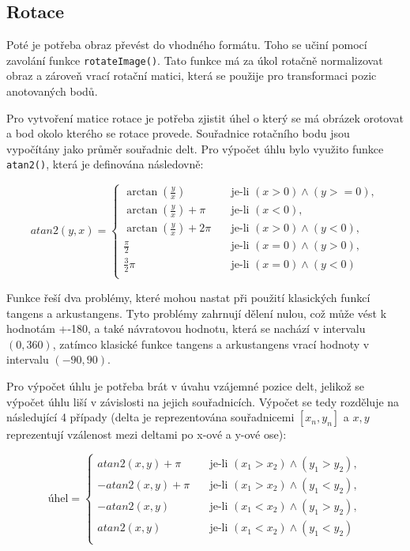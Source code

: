 \subsection{Rotace}
Poté je potřeba obraz převést do vhodného formátu. Toho se učiní pomocí zavolání funkce \texttt{rotateImage()}. Tato funkce má za úkol rotačně normalizovat obraz a zároveň vrací rotační matici, která se použije pro transformaci pozic anotovaných bodů.

Pro vytvoření matice rotace je potřeba zjistit úhel o který se má obrázek orotovat a bod okolo kterého se rotace provede. Souřadnice rotačního bodu jsou vypočítány jako průměr souřadnic delt. Pro výpočet úhlu bylo využito funkce \texttt{atan2()}, která je definována následovně:  

\begin{equation}
    atan2(y,x) = 
            \begin{cases}
                    \arctan (\frac{y}{x})  & \quad\text{je-li } (x > 0) \land (y >= 0),\\
                    \arctan (\frac{y}{x}) + \pi & \quad\text{je-li } (x < 0), \\
                    \arctan (\frac{y}{x}) + 2\pi & \quad\text{je-li } (x > 0) \land (y < 0), \\
                    \frac{\pi}{2}    & \quad\text{je-li } (x = 0) \land (y > 0), \\ 
                    \frac{3}{2} \pi  & \quad\text{je-li } (x = 0) \land (y < 0) \\ 
            \end{cases}
\end{equation}

Funkce řeší dva problémy, které mohou nastat při použití klasických funkcí tangens a arkustangens. Tyto problémy zahrnují dělení nulou, což může vést k hodnotám +-180, a také návratovou hodnotu, která se nachází v intervalu $(0, 360)$, zatímco klasické funkce tangens a arkustangens vrací hodnoty v intervalu $(-90, 90)$.

Pro výpočet úhlu je potřeba brát v úvahu vzájemné pozice delt, jelikož se výpočet úhlu liší v závislosti na jejich souřadnicích. Výpočet se tedy rozděluje na následující 4 případy (delta je reprezentována souřadnicemi $[x_{n}, y_{n}]$ a $x,y$ reprezentují vzálenost mezi deltami po x-ové a y-ové ose):


\begin{equation}
    \text{úhel} = 
            \begin{cases}
                    atan2(x,y) + \pi & \quad\text{je-li } (x_{1} > x_{2}) \land (y_{1} > y_{2}), \\
                    -atan2(x,y) + \pi & \quad\text{je-li } (x_{1} > x_{2}) \land (y_{1} < y_{2}), \\
                    -atan2(x,y) & \quad\text{je-li } (x_{1} < x_{2}) \land (y_{1} > y_{2}), \\
                    atan2(x,y) & \quad\text{je-li } (x_{1} < x_{2}) \land (y_{1} < y_{2}) \\ 
            \end{cases}
\end{equation}

